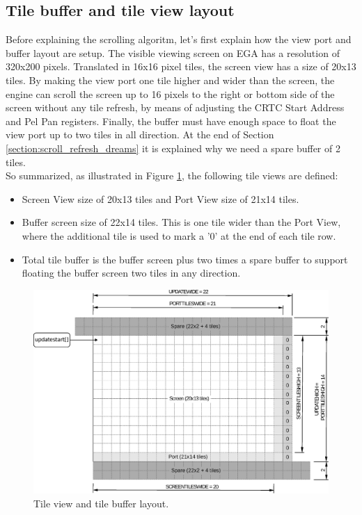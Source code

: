 \documentclass[book.tex]{subfiles}
\begin{document}
\subsection{Tile buffer and tile view layout}
Before explaining the scrolling algoritm, let's first explain how the view port and buffer layout are setup. The visible viewing screen on EGA has a resolution of 320x200 pixels. Translated in 16x16 pixel tiles, the screen view has a size of 20x13 tiles. By making the view port one tile higher and wider than the screen, the engine can scroll the screen up to 16 pixels to the right or bottom side of the screen without any tile refresh, by means of adjusting the CRTC Start Address and Pel Pan registers. Finally, the buffer must have enough space to float the view port up to two tiles in all direction. At the end of Section \ref{section:scroll_refresh_dreams} it is explained why we need a spare buffer of 2 tiles.\\

So summarized, as illustrated in Figure \ref{fig:screen_setup}, the following tile views are defined:
\begin{itemize}
\item Screen View size of 20x13 tiles and Port View size of 21x14 tiles.
\item Buffer screen size of 22x14 tiles. This is one tile wider than the Port View, where the additional tile is used to mark a '0' at the end of each tile row. 
\item Total tile buffer is the buffer screen plus two times a spare buffer to support floating the buffer screen two tiles in any direction.
\end{itemize}
\par
 
\begin{figure}[H]
\centering
\includegraphics[width=\textwidth]{imgs/drawings/buffer_tile_layout.eps}
\caption{Tile view and tile buffer layout.}
\label{fig:screen_setup}
\end{figure}
\end{document}

